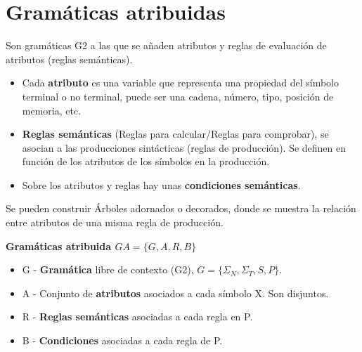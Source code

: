 \documentclass[12pt, twoside, openright]{report} %
\begin{document}
\section{Gramáticas atribuidas}
Son gramáticas G2 a las que se añaden atributos y reglas de evaluación de atributos (reglas semánticas).
\begin{itemize}
  \item Cada \textbf{atributo} es una variable que representa una propiedad del símbolo terminal o no terminal, puede ser una cadena, número, tipo, posición de memoria, etc.
  \item \textbf{Reglas semánticas} (Reglas para calcular/Reglas para comprobar), se asocian a las producciones sintácticas (reglas de producción). Se definen en función de los atributos de los símbolos en la producción.
  \item Sobre los atributos y reglas hay unas \textbf{condiciones semánticas}.
\end{itemize}

Se pueden construir Árboles adornados o decorados, donde se muestra la relación entre atributos de una misma regla de producción.

\textbf{Gramáticas atribuida $GA=\{G,A,R,B\}$}
\begin{itemize}
  \item G - \textbf{Gramática} libre de contexto (G2), $G = \{\Sigma_N, \Sigma_T, S, P\}$.
  \item A - Conjunto de \textbf{atributos} asociados a cada símbolo X. Son disjuntos.
  \item R - \textbf{Reglas semánticas} asociadas a cada regla en P.
  \item B - \textbf{Condiciones} asociadas a cada regla de P.
\end{itemize}
\end{document}
